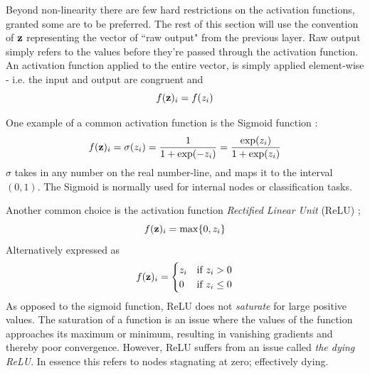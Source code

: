 Beyond non-linearity there are few hard restrictions on the activation functions, granted some are to be preferred.
The rest of this section will use the convention of $\bold{z}$ representing the vector of ``raw output" from the previous layer. Raw output simply refers to the values before they're passed through the activation function. An activation function applied to the entire vector, is simply applied element-wise - i.e. the input and output are congruent and
\begin{equation}
    f(\bold{z})_i = f(z_i)
\end{equation}

One example of a common activation function is the Sigmoid function \citep[Logistic Regression]{morten}: 
\begin{equation}\label{sigmoid}
    f(\bold{z})_i=\sigma(z_i)=\frac{1}{1+\exp(-z_i)}=\frac{\exp(z_i)}{1+\exp(z_i)}
\end{equation}
$\sigma$ takes in any number on the real number-line, and maps it to the interval $(0,1)$. The Sigmoid is normally used for internal nodes or classification tasks. 

Another common choice is the activation function \textit{Rectified Linear Unit} (ReLU) \citep[Building a feed forward neural network]{morten}; 
\begin{equation}\label{relu}
    f(\bold{z})_i=\max\{0, z_i\}
\end{equation}
Alternatively expressed as
\begin{equation}
    f(\bold{z})_i = \begin{cases} 
      z_i & \text{if } z_i > 0 \\
      0 & \text{if } z_i \leq 0 
   \end{cases}    
\end{equation}
As opposed to the sigmoid function, ReLU does not \textit{saturate} for large positive values. The saturation of a function is an issue where the values of the function approaches its maximum or minimum, resulting in vanishing gradients and thereby poor convergence. However, ReLU suffers from an issue called \textit{the dying ReLU}. In essence this refers to nodes stagnating at zero; effectively dying. 

